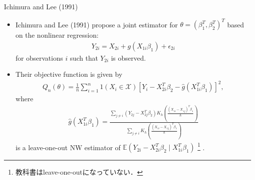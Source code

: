 \documentclass[xcolor=svgnames,dvipdfmx,cjk]{beamer}
\theoremstyle{example}
\def\E{\mathbb{E}}
\begin{document}
\begin{frame}{Ichimura and Lee (1991)}
      \begin{itemize}
            \item Ichimura and Lee (1991) propose a joint estimator for $\theta = (\beta_1^T, \beta_2^T)^T$ 
                  based on the nonlinear regression:
                  \begin{align*}
                        Y_{2i} = X_{2i} + g(X_{1i}\beta_1) + \epsilon_{2i}
                  \end{align*}
                  for observations $i$ such that $Y_{2i}$ is observed.
            \item Their objective function is given by 
                  \begin{align*}
                        Q_n(\theta) 
                              = \frac{1}{n} \sum_{i=1}^n
                                1(X_i \in \mathcal{X}) 
                                \left[
                                    Y_i 
                                    - X_{2i}^T \beta_2 
                                    - \hat{g}(X_{1i}^T \beta_1)
                                \right]^2,
                  \end{align*}
                  where
                  \begin{align*}
                        \hat{g}(X_{1i}^T \beta_1) 
                              = \frac
                                    {
                                          \sum_{j \neq i} (Y_{2j} - X_{2j}^T\beta_2)
                                          K_h\left(
                                                \frac{(X_{1i} - X_{1j})^T \beta_1}{h}
                                          \right)
                                    }{
                                          \sum_{j \neq i} 
                                          K_h\left(
                                                \frac{(X_{1i} - X_{1j})^T \beta_1}{h}
                                          \right)
                                    }
                  \end{align*}
                  is a leave-one-out NW estimator of 
                  $\E(Y_{2i} - X_{2i}^T \beta_2 \mid X_{1i}^T \beta_1)$
                  \footnote{教科書はleave-one-outになっていない．}
                  .
      \end{itemize}
\end{frame}
\end{document}
